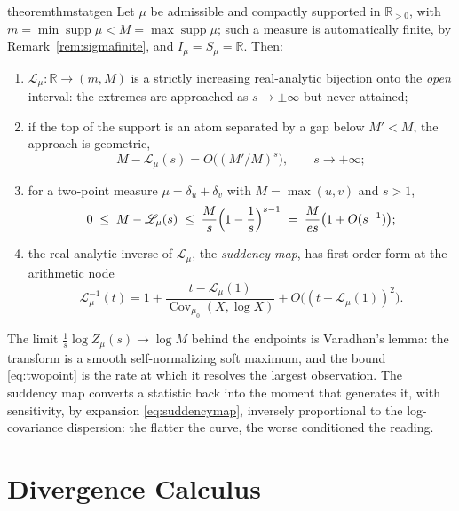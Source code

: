 \documentclass[sn-mathphys-num]{sn-jnl}
\theoremstyle{thmstyleone}%
\theoremstyle{thmstyletwo}%
\theoremstyle{thmstylethree}%
\theoremstyle{thmstyleone}%
\providecommand{\R}{\mathbb{R}}
\providecommand{\Cov}{\operatorname{Cov}}
\providecommand{\Rpos}{\mathbb{R}_{>0}}
\providecommand{\Leh}{\mathscr{L}}
\providecommand{\supp}{\operatorname{supp}}
\begin{document}
	\begin{restatable}{theorem}{thmstatgen}
		\label{thm:statgen}
		Let $\mu$ be admissible and compactly supported in $\Rpos$, with
		$m=\min\supp\mu<M=\max\supp\mu$; such a measure is automatically
		finite, by Remark~\ref{rem:sigmafinite}, and $I_\mu=S_\mu=\R$.
		Then:
		\begin{enumerate}[label=\textup{(\roman*)},leftmargin=2.2em]
			\item $\Leh_\mu:\R\to(m,M)$ is a strictly increasing
			real-analytic bijection onto the \emph{open} interval: the
			extremes are approached as $s\to\pm\infty$ but never
			attained;
			\item if the top of the support is an atom separated by a gap
			below $M'<M$, the approach is geometric,
			\begin{equation}\label{eq:georate}
				M-\Leh_\mu(s)=O\bigl((M'/M)^{s}\bigr),
				\qquad s\to+\infty;
			\end{equation}
			\item for a two-point measure $\mu=\delta_u+\delta_v$ with
			$M=\max(u,v)$ and $s>1$,
			\begin{equation}\label{eq:twopoint}
				0\;\le\;M-\Leh_\mu(s)\;\le\;
				\frac{M}{s}\Bigl(1-\frac1s\Bigr)^{s-1}
				\;=\;\frac{M}{es}\bigl(1+O(s^{-1})\bigr);
			\end{equation}
			\item the real-analytic inverse of $\Leh_\mu$, the
			\emph{suddency map}, has first-order form at the arithmetic
			node
			\begin{equation}\label{eq:suddencymap}
				\Leh_\mu^{-1}(t)=1+\frac{t-\Leh_\mu(1)}
				{\Cov_{\mu_0}(X,\log X)}
				+O\bigl((t-\Leh_\mu(1))^2\bigr).
			\end{equation}
		\end{enumerate}
	\end{restatable}
	
	The limit $\tfrac1s\log Z_\mu(s)\to\log M$ behind the endpoints
	is Varadhan's lemma: the transform is a smooth self-normalizing soft
	maximum, and the bound \eqref{eq:twopoint} is the rate at which it
	resolves the largest observation. The suddency map converts a
	statistic back into the moment that generates it, with sensitivity,
	by expansion \eqref{eq:suddencymap}, inversely proportional to the
	log-covariance dispersion: the flatter the curve, the worse
	conditioned the reading.
	
	\section{Divergence Calculus}\label{sec:divergence}
	
\end{document}
